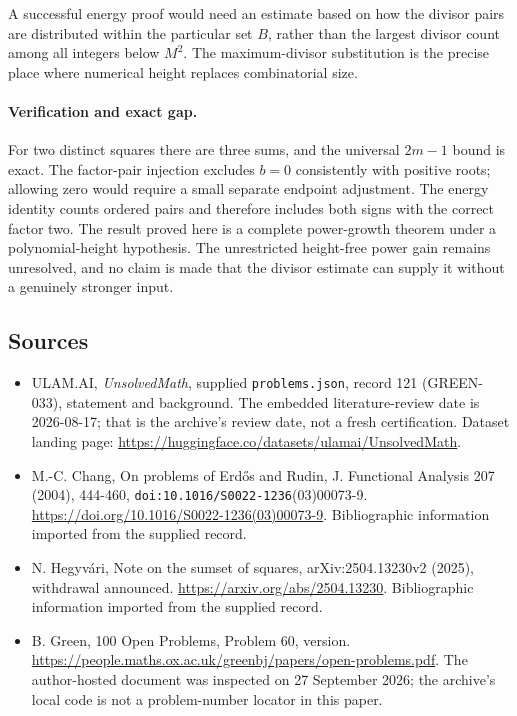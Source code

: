 \documentclass[11pt,a4paper]{article}
\begin{document}
A successful energy proof would need an estimate based on how the divisor pairs are distributed within the particular set $B$, rather than the largest divisor count among all integers below $M^2$. The maximum-divisor substitution is the precise place where numerical height replaces combinatorial size.

\paragraph{Verification and exact gap.}
For two distinct squares there are three sums, and the universal $2m-1$ bound is exact. The factor-pair injection excludes $b=0$ consistently with positive roots; allowing zero would require a small separate endpoint adjustment. The energy identity counts ordered pairs and therefore includes both signs with the correct factor two. The result proved here is a complete power-growth theorem under a polynomial-height hypothesis. The unrestricted height-free power gain remains unresolved, and no claim is made that the divisor estimate can supply it without a genuinely stronger input.

\subsection{Sources}

{\small

\begin{itemize}

\item[\hypertarget{source:121:1}{S1}] ULAM.AI, \emph{UnsolvedMath}, supplied \texttt{problems.json}, record 121 (GREEN-033), statement and background. The embedded literature-review date is 2026-08-17; that is the archive’s review date, not a fresh certification. Dataset landing page: \url{https://huggingface.co/datasets/ulamai/UnsolvedMath}.

\item[\hypertarget{source:121:2}{S2}] M.-C. Chang, On problems of Erdős and Rudin, J. Functional Analysis 207 (2004), 444-460, \nolinkurl{doi:10.1016/S0022-1236}(03)00073-9. \url{https://doi.org/10.1016/S0022-1236(03)00073-9}. Bibliographic information imported from the supplied record.

\item[\hypertarget{source:121:3}{S3}] N. Hegyvári, Note on the sumset of squares, arXiv:2504.13230v2 (2025), withdrawal announced. \url{https://arxiv.org/abs/2504.13230}. Bibliographic information imported from the supplied record.

\item[\hypertarget{source:121:4}{S4}] B. Green, 100 Open Problems, Problem 60, version. \url{https://people.maths.ox.ac.uk/greenbj/papers/open-problems.pdf}. The author-hosted document was inspected on 27 September 2026; the archive’s local code is not a problem-number locator in this paper.

\end{itemize}

}

\label{end:121}
\end{document}
